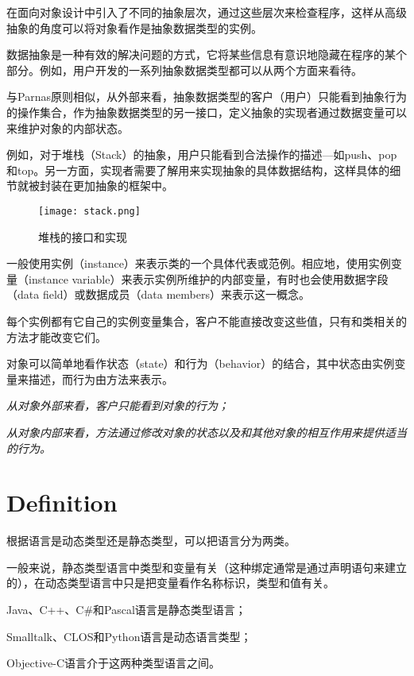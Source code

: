 在面向对象设计中引入了不同的抽象层次，通过这些层次来检查程序，这样从高级抽象的角度可以将对象看作是抽象数据类型的实例。

数据抽象是一种有效的解决问题的方式，它将某些信息有意识地隐藏在程序的某个部分。例如，用户开发的一系列抽象数据类型都可以从两个方面来看待。

与Parnas原则相似，从外部来看，抽象数据类型的客户（用户）只能看到抽象行为的操作集合，作为抽象数据类型的另一接口，定义抽象的实现者通过数据变量可以来维护对象的内部状态。

例如，对于堆栈（Stack）的抽象，用户只能看到合法操作的描述—如push、pop和top。另一方面，实现者需要了解用来实现抽象的具体数据结构，这样具体的细节就被封装在更加抽象的框架中。

\begin{figure}[htbp]
\centering
\texttt{[image: stack.png]}
\caption{堆栈的接口和实现}
\label{fig:stack}
\end{figure}

一般使用实例（instance）来表示类的一个具体代表或范例。相应地，使用实例变量（instance variable）来表示实例所维护的内部变量，有时也会使用数据字段（data field）或数据成员（data members）来表示这一概念。

每个实例都有它自己的实例变量集合，客户不能直接改变这些值，只有和类相关的方法才能改变它们。

对象可以简单地看作状态（state）和行为（behavior）的结合，其中状态由实例变量来描述，而行为由方法来表示。

\begin{compactitem}
\item \textsl{从对象外部来看，客户只能看到对象的行为；}
\item \textsl{从对象内部来看，方法通过修改对象的状态以及和其他对象的相互作用来提供适当的行为。}
\end{compactitem}


\chapter{Definition}

根据语言是动态类型还是静态类型，可以把语言分为两类。

一般来说，静态类型语言中类型和变量有关（这种绑定通常是通过声明语句来建立的），在动态类型语言中只是把变量看作名称标识，类型和值有关。

\begin{compactitem}
\item Java、C++、C\#和Pascal语言是静态类型语言；
\item Smalltalk、CLOS和Python语言是动态语言类型；
\item Objective-C语言介于这两种类型语言之间。
\end{compactitem}

